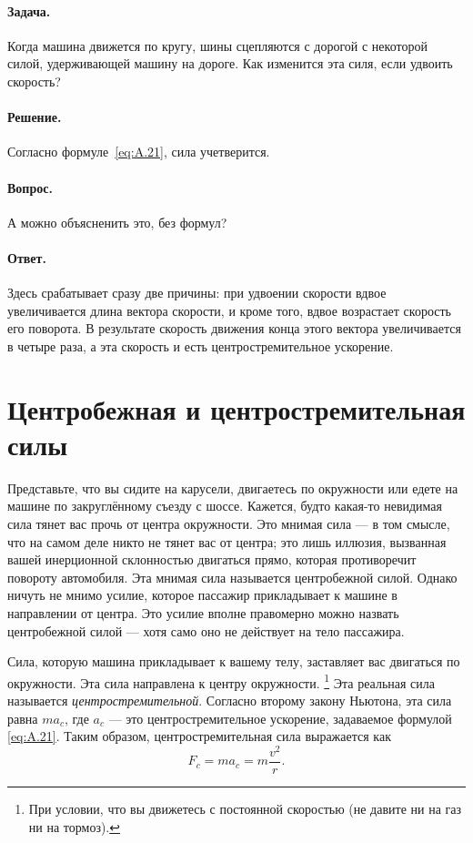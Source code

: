 \paragraph{Задача.}
Когда машина движется по кругу, шины сцепляются с дорогой с некоторой силой, удерживающей машину на дороге.
Как изменится эта силя, если удвоить скорость?

\paragraph{Решение.}
Согласно формуле~\eqref{eq:A.21}, сила учетверится.

\paragraph{Вопрос.}
А можно объясненить это, без формул?

\paragraph{Ответ.}
Здесь срабатывает сразу две причины:
при удвоении скорости вдвое увеличивается длина вектора скорости, и кроме того, вдвое возрастает скорость его поворота.
В результате скорость движения конца этого вектора увеличивается в четыре раза, а эта скорость и есть центростремительное ускорение.

\section{Центробежная и центростремительная силы}\label{Центробежная и центростремительная силы}

Представьте, что вы сидите на карусели, двигаетесь по окружности или едете на машине по закруглённому съезду с шоссе.
Кажется, будто какая-то невидимая сила тянет вас прочь от центра окружности.
Это мнимая сила — в том смысле, что на самом деле никто не тянет вас от центра; это лишь иллюзия, вызванная вашей инерционной склонностью двигаться прямо, которая противоречит повороту автомобиля.
Эта мнимая сила называется центробежной силой.
Однако ничуть не мнимо усилие, которое пассажир прикладывает к машине в направлении от центра.
Это усилие вполне правомерно можно назвать центробежной силой — хотя само оно не действует на тело пассажира.

Сила, которую машина прикладывает к вашему телу, заставляет вас двигаться по окружности.
Эта сила направлена к центру окружности.%
\footnote{При условии, что вы движетесь с постоянной скоростью (не давите ни на газ ни на тормоз).}
Эта реальная сила называется \emph{центростремительной}.
Согласно второму закону Ньютона, эта сила равна $ma_{c}$, где $a_{c}$ — это центростремительное ускорение, задаваемое формулой \eqref{eq:A.21}.
Таким образом, центростремительная сила выражается как
\[F_{c} = ma_{c} = m\frac{v^2}{r}.\]

